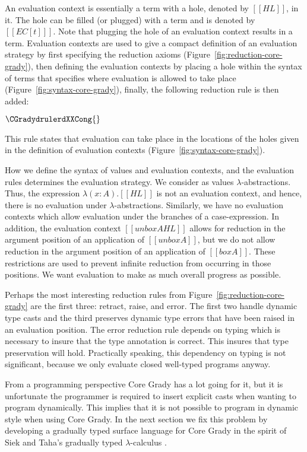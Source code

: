 An evaluation context is essentially a term with a hole, denoted by
$[[HL]]$, in it.  The hole can be filled (or plugged) with a term and
is denoted by $[[EC[t] ]]$.  Note that plugging the hole of an
evaluation context results in a term.  Evaluation contexts are used to
give a compact definition of an evaluation strategy by first specifying
the reduction axioms (Figure~\ref{fig:reduction-core-grady}), then
defining the evaluation contexts by placing a hole within the syntax
of terms that specifies where evaluation is allowed to take place
(Figure~\ref{fig:syntax-core-grady}), finally, the following reduction
rule is then added:
\begin{center}\small
  \begin{math}
    \CGradydrulerdXXCong{}
  \end{math}
\end{center}
This rule states that evaluation can take place in the locations of
the holes given in the definition of evaluation contexts
(Figure~\ref{fig:syntax-core-grady}).

How we define the syntax of values and evaluation contexts, and the
evaluation rules determines the evaluation strategy.  We consider as
values $\lambda$-abstractions. Thus, the expression $\lambda
(x:A).[[HL]]$ is not an evaluation context, and hence, there is no
evaluation under $\lambda$-abstractions.  Similarly, we have no
evaluation contexts which allow evaluation under the branches of a
case-expression.  In addition, the evaluation context $[[unbox A HL]]$
allows for reduction in the argument position of an application of
$[[unbox A]]$, but we do not allow reduction in the argument position
of an application of $[[box A]]$. These restrictions are used to
prevent infinite reduction from occurring in those positions.  We want
evaluation to make as much overall progress as possible.

Perhaps the most interesting reduction rules from
Figure~\ref{fig:reduction-core-grady} are the first three: retract,
raise, and error.  The first two handle dynamic type casts and the
third preserves dynamic type errors that have been raised in an
evaluation position.  The error reduction rule depends on typing which
is necessary to insure that the type annotation is correct.  This
insures that type preservation will hold.  Practically speaking, this
dependency on typing is not significant, because we only evaluate
closed well-typed programs anyway.

From a programming perspective Core Grady has a lot going for it, but
it is unfortunate the programmer is required to insert explicit casts
when wanting to program dynamically.  This implies that it is not
possible to program in dynamic style when using Core Grady.  In the
next section we fix this problem by developing a gradually typed
surface language for Core Grady in the spirit of Siek and Taha's
gradually typed $\lambda$-calculus \cite{Siek:2006,Siek:2015}.

